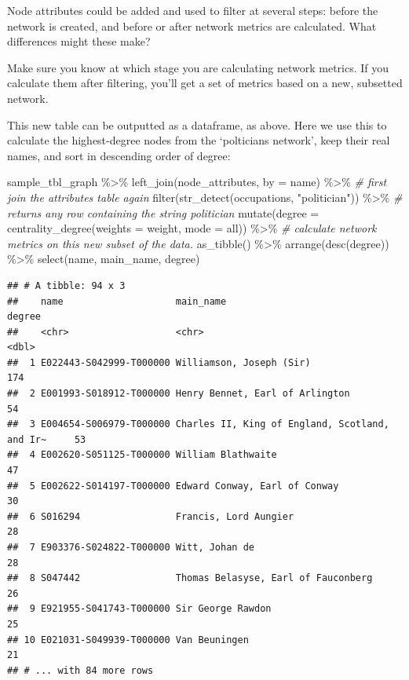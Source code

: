 \documentclass[
]{book}
\newenvironment{Shaded}{\begin{snugshade}}{\end{snugshade}}
\newcommand{\AttributeTok}[1]{\textcolor[rgb]{0.77,0.63,0.00}{#1}}
\newcommand{\CommentTok}[1]{\textcolor[rgb]{0.56,0.35,0.01}{\textit{#1}}}
\newcommand{\FunctionTok}[1]{\textcolor[rgb]{0.00,0.00,0.00}{#1}}
\newcommand{\NormalTok}[1]{#1}
\newcommand{\SpecialCharTok}[1]{\textcolor[rgb]{0.00,0.00,0.00}{#1}}
\newcommand{\StringTok}[1]{\textcolor[rgb]{0.31,0.60,0.02}{#1}}
\begin{document}
Node attributes could be added and used to filter at several steps: before the network is created, and before or after network metrics are calculated. What differences might these make?

Make sure you know at which stage you are calculating network metrics. If you calculate them after filtering, you'll get a set of metrics based on a new, subsetted network.

This new table can be outputted as a dataframe, as above. Here we use this to calculate the highest-degree nodes from the `polticians network', keep their real names, and sort in descending order of degree:

\begin{Shaded}
\begin{Highlighting}[]
\NormalTok{sample\_tbl\_graph }\SpecialCharTok{\%\textgreater{}\%} 
  \FunctionTok{left\_join}\NormalTok{(node\_attributes, }\AttributeTok{by =} \StringTok{\textquotesingle{}name\textquotesingle{}}\NormalTok{) }\SpecialCharTok{\%\textgreater{}\%} \CommentTok{\# first join the attributes table again}
  \FunctionTok{filter}\NormalTok{(}\FunctionTok{str\_detect}\NormalTok{(occupations, }\StringTok{"politician"}\NormalTok{)) }\SpecialCharTok{\%\textgreater{}\%} \CommentTok{\# returns any row containing the string \textquotesingle{}politician\textquotesingle{}}
  \FunctionTok{mutate}\NormalTok{(}\AttributeTok{degree =} \FunctionTok{centrality\_degree}\NormalTok{(}\AttributeTok{weights =}\NormalTok{ weight, }\AttributeTok{mode =} \StringTok{\textquotesingle{}all\textquotesingle{}}\NormalTok{))  }\SpecialCharTok{\%\textgreater{}\%}   \CommentTok{\# calculate network metrics on this new subset of the data.}
\FunctionTok{as\_tibble}\NormalTok{() }\SpecialCharTok{\%\textgreater{}\%} 
  \FunctionTok{arrange}\NormalTok{(}\FunctionTok{desc}\NormalTok{(degree)) }\SpecialCharTok{\%\textgreater{}\%} \FunctionTok{select}\NormalTok{(name, main\_name, degree)}
\end{Highlighting}
\end{Shaded}

\begin{verbatim}
## # A tibble: 94 x 3
##    name                    main_name                                      degree
##    <chr>                   <chr>                                           <dbl>
##  1 E022443-S042999-T000000 Williamson, Joseph (Sir)                          174
##  2 E001993-S018912-T000000 Henry Bennet, Earl of Arlington                    54
##  3 E004654-S006979-T000000 Charles II, King of England, Scotland, and Ir~     53
##  4 E002620-S051125-T000000 William Blathwaite                                 47
##  5 E002622-S014197-T000000 Edward Conway, Earl of Conway                      30
##  6 S016294                 Francis, Lord Aungier                              28
##  7 E903376-S024822-T000000 Witt, Johan de                                     28
##  8 S047442                 Thomas Belasyse, Earl of Fauconberg                26
##  9 E921955-S041743-T000000 Sir George Rawdon                                  25
## 10 E021031-S049939-T000000 Van Beuningen                                      21
## # ... with 84 more rows
\end{verbatim}
\end{document}
